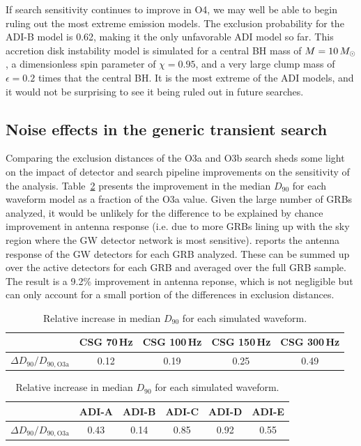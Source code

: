 If search sensitivity continues to improve in \ac{O4}, we may well be able to begin ruling out the most extreme emission models.
The exclusion probability for the ADI-B model is 0.62, making it the only unfavorable ADI model so far.
This accretion disk instability model is simulated for a central \ac{BH} mass of $M=10\,M_{\odot}$, a dimensionless spin parameter of $\chi=0.95$, and a very large clump mass of $\epsilon=0.2$ times that the central \ac{BH}.
It is the most extreme of the ADI models, and it would not be surprising to see it being ruled out in future searches.


\subsection{Noise effects in the generic transient search}\label{sec:grb-o3b-noise}

Comparing the exclusion distances of the O3a and O3b search sheds some light on the impact of detector and search pipeline improvements on the sensitivity of the \xpip analysis.
Table~\ref{tab:grb-o3b-compare-o3a} presents the improvement in the median $D_{90}$ for each waveform model as a fraction of the O3a value.
Given the large number of GRBs analyzed, it would be unlikely for the difference to be explained by chance improvement in antenna response (i.e. due to more GRBs lining up with the sky region where the GW detector network is most sensitive).
\xpip reports the antenna response of the GW detectors for each GRB analyzed.
These can be summed up over the active detectors for each GRB and averaged over the full GRB sample.
The result is a 9.2\% improvement in antenna reponse, which is not negligible but can only account for a small portion of the differences in exclusion distances.

\begin{table}[h]
  \hspace{0.5cm}
  \caption
  {\label{tab:grb-o3b-compare-o3a} Relative increase in median $D_{90}$ for each \xpip simulated waveform.}
  \begin{tabular}{c c c c c}
    \hline
    \hline
    \rule{0pt}{4ex}
    & CSG 70\,Hz & CSG 100\,Hz & CSG 150\,Hz & CSG 300\,Hz \\
    \hline
    \rule[-2ex]{0pt}{4ex}
		$\Delta D_{90} / D_{90, \text{O3a}}$ & 0.12 & 0.19 & 0.25 & 0.49
  \end{tabular}
  \begin{tabular}{c c c c c c}
    \hline
    \hline
    \rule{0pt}{4ex}
    & ADI-A & ADI-B & ADI-C & ADI-D & ADI-E \\
    \hline
    \rule[-2ex]{0pt}{4ex}
    $\Delta D_{90} / D_{90, \text{O3a}}$ & 0.43 & 0.14 & 0.85 & 0.92 & 0.55 \\
    \hline
  \end{tabular}
\end{table}

